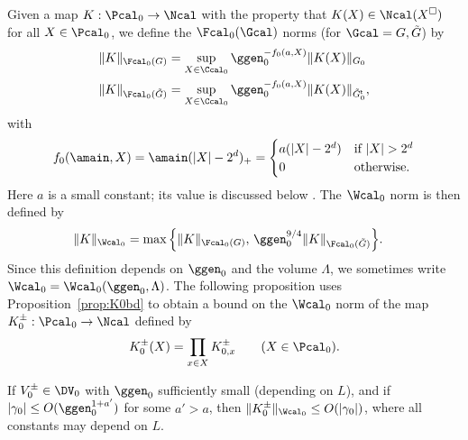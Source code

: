 Given a map $K: \Pcal_0 \to \Ncal$ with the property that $K(X) \in \Ncal(X^\Box)$
for all $X \in \Pcal_0$,
we define the $\Fcal_0(\Gcal)$ norms (for $\Gcal = G, \tilde G$) by
\begin{align}
\|K\|_{\Fcal_0(G)}        &= \sup_{X\in\Ccal_0} \ggen_0^{-f_0(a, X)} \|K(X)\|_{G_0} \\
\|K\|_{\Fcal_0(\tilde G)} &= \sup_{X\in\Ccal_0}
\ggen_0^{-f_0(a, X)} \|K(X)\|_{\tilde G_0^{\sf t}},
\end{align}
with
\begin{equation}
    \label{e:f0def}
    f_0 (\amain, X)
    =
    \amain (|X|-2^d)_+
    =
    \begin{cases}
    a (|X| - 2^d)
    & \text{if } |X| > 2^d   \\
    0
    & \text{otherwise}.
    \end{cases}
\end{equation}
Here $a$ is a small constant;  its value is discussed below \cite[\eqref{step-e:T0dom}]{BS-rg-step}.
The $\Wcal_0$ norm is then defined by
\begin{align}
\label{e:9Kcalnorm}
\|K\|_{\Wcal_0}
  &=
  \max
  \Big\{
  \|K \|_{\Fcal_0(G)},\,
  \ggen_0^{9/4}
  \|K \|_{\Fcal_0(\tilde{G})}
  \Big\}.
\end{align}
Since this definition depends on $\ggen_0$ and the
volume $\Lambda$, we sometimes write $\Wcal_0 = \Wcal_0(\ggen_0, \Lambda)$.
The following proposition uses Proposition~\ref{prop:K0bd} to obtain a bound on the $\Wcal_0$ norm
of the map $K_0^\pm : \Pcal_0 \to \Ncal$ defined by
\begin{equation}
    K_0^\pm(X) = \prod_{x \in X} K_{0,x}^\pm \qquad (X \in \Pcal_0)
    .
\end{equation}

\begin{prop}
\label{prop:KWcal}
If $V_0^\pm \in \DV_0$ with $\ggen_0$ sufficiently small
(depending on $L$), and if $|\gamma_0| \le O(\ggen_0^{1+a'})$
for some $a' >a$,
then $\|K_0^\pm\|_{\Wcal_0} \le O(|\gamma_0|)$,
where all constants may depend on $L$.
\end{prop}

